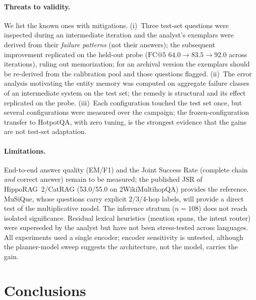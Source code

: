 \documentclass[11pt,a4paper]{article}
\newcommand{\hippo}{HippoRAG~2}
\begin{document}
\paragraph{Threats to validity.} We list the known ones with mitigations.
(i)~Three test-set questions were inspected during an intermediate iteration
and the analyst's exemplars were derived from their \emph{failure patterns}
(not their answers); the subsequent improvement replicated on the held-out
probe ($\mathrm{FC@}5$ $64.0\to83.5\to92.0$ across iterations), ruling out
memorization; for an archival version the exemplars should be re-derived
from the calibration pool and those questions flagged. (ii)~The error
analysis motivating the entity memory was computed on aggregate failure
classes of an intermediate system on the test set; the remedy is structural
and its effect replicated on the probe. (iii)~Each configuration touched the
test set once, but several configurations were measured over the campaign;
the frozen-configuration transfer to HotpotQA, with zero tuning, is the
strongest evidence that the gains are not test-set adaptation.

\paragraph{Limitations.} End-to-end answer quality (EM/F1) and the Joint
Success Rate (complete chain \emph{and} correct answer) remain to be
measured; the published JSR of \hippo{}/CatRAG (53.0/55.0 on
2WikiMultihopQA) provides the reference. MuSiQue, whose questions carry
explicit 2/3/4-hop labels, will provide a direct test of the multiplicative
model. The inference stratum ($n{=}108$) does not reach isolated
significance. Residual lexical heuristics (mention spans, the intent router)
were superseded by the analyst but have not been stress-tested across
languages. All experiments used a single encoder; encoder sensitivity is
untested, although the planner-model sweep suggests the architecture, not
the model, carries the gain.

\section{Conclusions}
\label{sec:conclusions}
\end{document}
